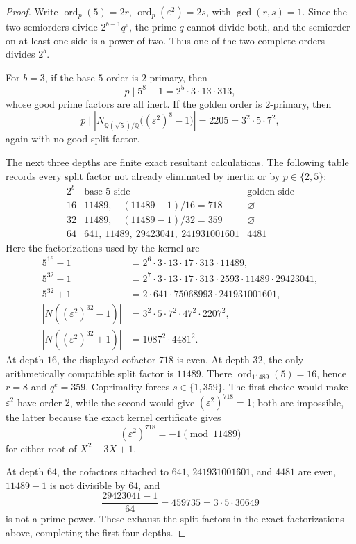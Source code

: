 \documentclass[11pt]{amsart}
\theoremstyle{definition}
\theoremstyle{remark}
\newcommand{\Q}{\mathbb{Q}}
\newcommand{\eps}{\varepsilon}
\newcommand{\ord}{\operatorname{ord}}
\begin{document}
\begin{proof}
Write \(\ord_p(5)=2r\), \(\ord_p(\eps^2)=2s\), with
\(\gcd(r,s)=1\). Since the two semiorders divide
\(2^{b-1}q^e\), the prime \(q\) cannot divide both, and the semiorder
on at least one side is a power of two.  Thus one of the two complete
orders divides \(2^b\).

For \(b=3\), if the base-\(5\) order is \(2\)-primary, then
\[
p\mid5^8-1=2^5\cdot3\cdot13\cdot313,
\]
whose good prime factors are all inert.  If the golden order is
\(2\)-primary, then
\[
p\mid\left|N_{\Q(\sqrt5)/\Q}\bigl((\eps^2)^8-1\bigr)\right|
=2205=3^2\cdot5\cdot7^2,
\]
again with no good split factor.

The next three depths are finite exact resultant calculations.  The
following table records every split factor not already eliminated by
inertia or by \(p\in\{2,5\}\):
\[
\begin{array}{c|c|c}
2^b & \text{base-5 side} & \text{golden side}\\ \hline
16 & 11489,\quad (11489-1)/16=718 & \varnothing\\
32 & 11489,\quad (11489-1)/32=359 & \varnothing\\
64 & 641,\ 11489,\ 29423041,\ 241931001601
   & 4481
\end{array}
\]
Here the factorizations used by the kernel are
\[
\begin{aligned}
5^{16}-1&=2^6\cdot3\cdot13\cdot17\cdot313\cdot11489,\\
5^{32}-1&=2^7\cdot3\cdot13\cdot17\cdot313\cdot2593
 \cdot11489\cdot29423041,\\
5^{32}+1&=2\cdot641\cdot75068993\cdot241931001601,\\
\left|N((\eps^2)^{32}-1)\right|
 &=3^2\cdot5\cdot7^2\cdot47^2\cdot2207^2,\\
\left|N((\eps^2)^{32}+1)\right|
 &=1087^2\cdot4481^2.
\end{aligned}
\]
At depth \(16\), the displayed cofactor \(718\) is even.  At depth
\(32\), the only arithmetically compatible split factor is \(11489\).
There \(\ord_{11489}(5)=16\), hence \(r=8\) and \(q^e=359\).
Coprimality forces \(s\in\{1,359\}\).  The first choice would make
\(\eps^2\) have order \(2\), while the second would give
\((\eps^2)^{718}=1\); both are impossible, the latter because the exact
kernel certificate gives
\[
(\eps^2)^{718}=-1\pmod{11489}
\]
for either root of \(X^2-3X+1\).

At depth \(64\), the cofactors attached to \(641\), \(241931001601\),
and \(4481\) are even, \(11489-1\) is not divisible by \(64\), and
\[
\frac{29423041-1}{64}=459735=3\cdot5\cdot30649
\]
is not a prime power.  These exhaust the split factors in the exact
factorizations above, completing the first four depths.


\end{proof}
\end{document}
